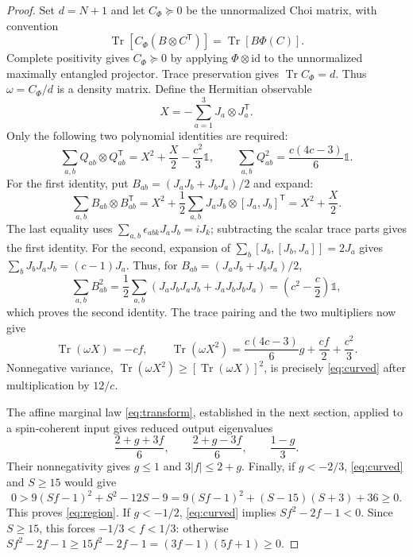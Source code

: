 \documentclass[11pt,a4paper]{article}
\DeclareMathOperator{\Tr}{Tr}
\newcommand{\id}{\mathds{1}}
\begin{document}
\begin{proof}
Set $d=N+1$ and let $C_\Phi\succeq0$ be the unnormalized Choi
matrix, with convention
\begin{equation}\label{eq:choi-trace}
 \Tr[C_\Phi(B\otimes C^{\mathsf T})]=\Tr[B\Phi(C)].
\end{equation}
Complete positivity gives $C_\Phi\succeq0$ by applying
$\Phi\otimes\mathrm{id}$ to the unnormalized maximally entangled
projector. Trace preservation gives $\Tr C_\Phi=d$.
Thus $\omega=C_\Phi/d$ is a density matrix.
Define the Hermitian observable
\[
 X=-\sum_{a=1}^3J_a\otimes J_a^{\mathsf T}.
\]
Only the following two polynomial identities are required:
\begin{equation}\label{eq:quadrupole}
 \sum_{a,b}Q_{ab}\otimes Q_{ab}^{\mathsf T}
 =X^2+\frac X2-\frac{c^2}3\id,
 \qquad
 \sum_{a,b}Q_{ab}^2=\frac{c(4c-3)}6\id.
\end{equation}
For the first identity, put $B_{ab}=(J_aJ_b+J_bJ_a)/2$ and expand:
\[
 \sum_{a,b}B_{ab}\otimes B_{ab}^{\mathsf T}
 =X^2+\frac12\sum_{a,b}J_aJ_b\otimes[J_a,J_b]^{\mathsf T}
 =X^2+\frac X2.
\]
The last equality uses $\sum_{a,b}\epsilon_{abk}J_aJ_b=iJ_k$;
subtracting the scalar trace parts gives the first identity.
For the second, expansion of
$\sum_b[J_b,[J_b,J_a]]=2J_a$ gives
$\sum_bJ_bJ_aJ_b=(c-1)J_a$. Thus, for
$B_{ab}=(J_aJ_b+J_bJ_a)/2$,
\[
 \sum_{a,b}B_{ab}^2
 =\frac12\sum_{a,b}(J_aJ_bJ_aJ_b+J_aJ_bJ_bJ_a)
 =\left(c^2-\frac c2\right)\id,
\]
which proves the second identity.
The trace pairing and the two multipliers now give
\[
 \Tr(\omega X)=-cf,\qquad
 \Tr(\omega X^2)=\frac{c(4c-3)}6g+\frac{cf}{2}+\frac{c^2}{3}.
\]
Nonnegative variance,
$\Tr(\omega X^2)\ge[\Tr(\omega X)]^2$, is precisely
\eqref{eq:curved} after multiplication by $12/c$.

The affine marginal law \eqref{eq:transform}, established in the next
section, applied to a spin-coherent input gives reduced output
eigenvalues
\[
 \frac{2+g+3f}{6},\qquad \frac{2+g-3f}{6},\qquad\frac{1-g}{3}.
\]
Their nonnegativity gives $g\le1$ and $3|f|\le2+g$.
Finally, if $g<-2/3$, \eqref{eq:curved} and $S\ge15$ would give
\[
 0>9(Sf-1)^2+S^2-12S-9
   =9(Sf-1)^2+(S-15)(S+3)+36\ge0.
\]
This proves \eqref{eq:region}. If $g<-1/2$,
\eqref{eq:curved} implies $Sf^2-2f-1<0$.
Since $S\ge15$, this forces $-1/3<f<1/3$: otherwise
$Sf^2-2f-1\ge15f^2-2f-1=(3f-1)(5f+1)\ge0$.
\end{proof}
\end{document}
